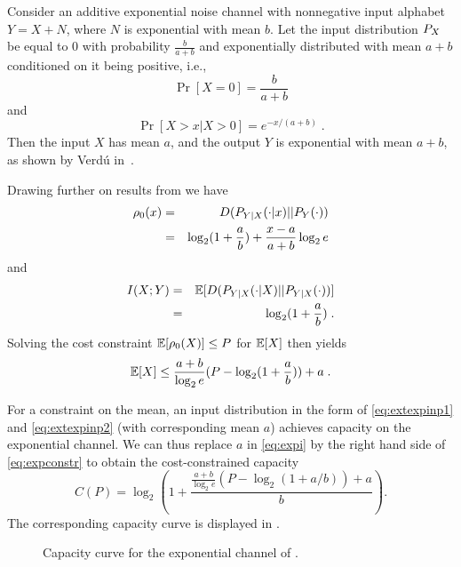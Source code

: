 \begin{example}[Exponential]\label{ex:expchannel}
  Consider an additive exponential noise channel with nonnegative input
  alphabet $Y = X + N$, where $N$ is exponential with mean $b$. Let the input
  distribution $P_X$ be equal to $0$ with probability $\frac{b}{a+b}$ and
  exponentially distributed with mean $a + b$ conditioned on it being positive,
  i.e.,
  \begin{equation}
    \label{eq:extexpinp1}
    \Pr[X = 0] = \frac{b}{a+b}
  \end{equation}
  and
  \begin{equation}
    \label{eq:extexpinp2}
    \Pr[X > x | X > 0] = e^{-x / (a+b)} \;.
  \end{equation}
  Then the input $X$ has mean $a$, and the output $Y$ is exponential with mean
  $a+b$, as shown by Verd\'u in~\cite{Verdu1996}. 

  Drawing further on results from \cite{Verdu1996} we have
  \begin{eqnarray*}
    {\rho_0}(x) &=&  D(P_{Y|X}(\cdot|x)||P_Y(\cdot)) \nonumber\\
    &=& \log_2(1 + \frac{a}{b}) + \frac{x - a}{a + b} \log_2 e
  \end{eqnarray*}
  and
  \begin{eqnarray}
    \label{eq:expi}
    I(X;Y) &=& \mathbb{E}[ D(P_{Y|X}(\cdot|X)||P_{Y|X}(\cdot))] \nonumber\\
    &=& \log_2(1 + \frac{a}{b}) \;.
  \end{eqnarray}
  Solving the cost constraint $\mathbb{E}[{\rho_0}(X)] \le P$ for $\mathbb{E}[X]$ then yields
  \begin{equation}
    \label{eq:expconstr}
    \mathbb{E}[X] \le \frac{a + b}{\log_2 e} (P - \log_2 (1 + \frac{a}{b})) + a \;.
  \end{equation}

  For a constraint on the mean, an input distribution in the form of
  \eqref{eq:extexpinp1} and \eqref{eq:extexpinp2} (with corresponding mean $a$)
  achieves capacity on the exponential channel. We can thus replace $a$
  in \eqref{eq:expi} by the right hand side of \eqref{eq:expconstr} to obtain
  the cost-constrained capacity
  \begin{equation}
    \label{eq:ccapexp}
    C(P) = \log_2 \left(1 + \frac{\frac{a+b}{\log_2 e}(P - \log_2(1 +
    a/b)) + a}{b}
    \right).
  \end{equation}
  The corresponding capacity curve is displayed in .
\end{example}

\begin{figure}
  \begin{center}
    
  \end{center}
  \caption{Capacity curve for the exponential channel of .}
  \label{fig:expchannel}
\end{figure}

